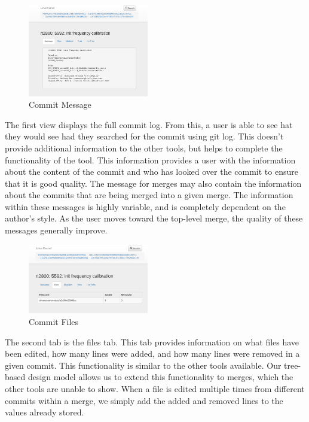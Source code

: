 \documentclass[conference, draftclsnofoot]{IEEEtran}
\begin{document}
\begin{figure}[h]
	\centering
	\includegraphics[width=0.47\textwidth]{figures/message_view.png}
	\caption{Commit Message}
	\label{fig:message}
\end{figure}

The first view displays the full commit log. From this, a user is able to see
hat they would see had they searched for the commit using git log. This doesn't
provide additional information to the other tools, but helps to complete the
functionality of the tool. This information provides a user with the
information about the content of the commit and who has looked over the commit
to ensure that it is good quality. The message for merges may also contain the
information about the commits that are being merged into a given merge. The
information within these messages is highly variable, and is completely
dependent on the author's style. As the user moves toward the top-level merge,
the quality of these messages generally improve.

\begin{figure}[h]
	\centering
	\includegraphics[width=0.47\textwidth]{figures/file_view.png}
	\caption{Commit Files}
	\label{fig:files}
\end{figure}

The second tab is the files tab. This tab provides information on what files
have been edited, how many lines were added, and how many lines were removed in
a given commit. This functionality is similar to the other tools available. Our
tree-based design model allows us to extend this functionality to merges, which
the other tools are unable to show. When a file is edited multiple times from
different commits within a merge, we simply add the added and removed lines to
the values already stored. 
\end{document}
